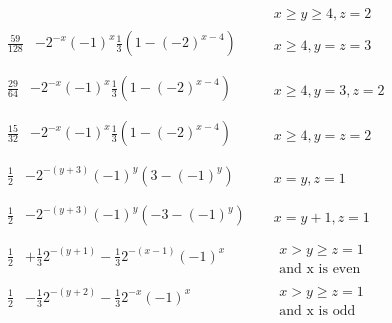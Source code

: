 \begin{thm}
\begin{subequations}
\begin{align}
\begin{split}
\end{split}
&&x\ge y\ge 4,z=2
\\
\label{eq:3row4}
\begin{split}
\frac{59}{128}&-2^{-x}(-1)^x\frac{1}{3}\left(1-(-2)^{x-4}\right)\\
\end{split}
&&x\ge 4,y=z=3
\\
\label{eq:3row5}
\begin{split}
\frac{29}{64}&-2^{-x}(-1)^x\frac{1}{3}\left(1-(-2)^{x-4}\right)\\
\end{split}
&&x\ge 4,y=3,z=2
\\
\label{eq:3row6}
\begin{split}
\frac{15}{32}&-2^{-x}(-1)^x\frac{1}{3}\left(1-(-2)^{x-4}\right)\\
\end{split}
&&x\ge 4,y=z=2
\\
\label{eq:3row7}
\begin{split}
\frac{1}{2}&-2^{-(y+3)}(-1)^y\left(3-(-1)^y\right)\\
\end{split}
&&x=y,z=1
\\
\label{eq:3row8}
\begin{split}
\frac{1}{2}&-2^{-(y+3)}(-1)^y\left(-3-(-1)^y\right)\\
\end{split}
&&x=y+1,z=1
\\
\label{eq:3row9}
\begin{split}
\frac{1}{2}&+\frac{1}{3}2^{-(y+1)}-\frac{1}{3}2^{-(x-1)}(-1)^x\\
\end{split}
&&
\begin{array}{l}
x>y\ge z=1\\
\text{and x is even}
\end{array}
\\
\label{eq:3row10}
\begin{split}
\frac{1}{2}&-\frac{1}{3}2^{-(y+2)}-\frac{1}{3}2^{-x}(-1)^x\\
\end{split}
&&
\begin{array}{l}
x>y\ge z=1\\
\text{and x is odd}
\end{array}

\end{align}
\end{subequations}
\end{thm}
